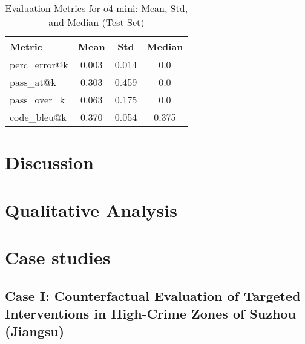 \begin{table}[h!]
\centering
\caption{Evaluation Metrics for o4-mini: Mean, Std, and Median (Test Set)}
{%
\begin{tabular}{l|ccc}
\toprule
\textbf{Metric} & \textbf{Mean} & \textbf{Std} & \textbf{Median} \\
\midrule
perc\_error@k     & 0.003 & 0.014 & 0.0   \\
pass\_at@k        & 0.303 & 0.459 & 0.0   \\
pass\_over\_k      & 0.063 & 0.175 & 0.0   \\
code\_bleu@k      & 0.370 & 0.054 & 0.375 \\
\bottomrule
\end{tabular}
}
\label{tab:metrics_new_data}
\end{table}


\section{Discussion}

\section{Qualitative Analysis}


\section{Case studies}

\subsection{Case I: Counterfactual Evaluation of Targeted Interventions in High-Crime Zones of Suzhou (Jiangsu)}

